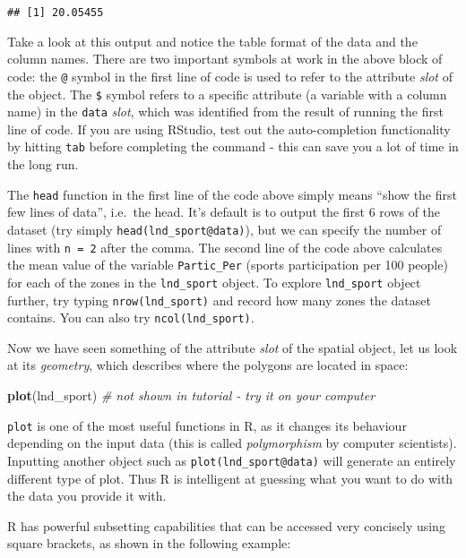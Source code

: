 \documentclass[]{article}
\newenvironment{Shaded}{}{}
\newcommand{\KeywordTok}[1]{\textcolor[rgb]{0.00,0.44,0.13}{\textbf{{#1}}}}
\newcommand{\CommentTok}[1]{\textcolor[rgb]{0.38,0.63,0.69}{\textit{{#1}}}}
\newcommand{\NormalTok}[1]{{#1}}
\begin{document}
\begin{verbatim}
## [1] 20.05455
\end{verbatim}

Take a look at this output and notice the table format of the data and
the column names. There are two important symbols at work in the above
block of code: the \texttt{@} symbol in the first line of code is used
to refer to the attribute \emph{slot} of the object. The \texttt{\$}
symbol refers to a specific attribute (a variable with a column name) in
the \texttt{data} \emph{slot}, which was identified from the result of
running the first line of code. If you are using RStudio, test out the
auto-completion functionality by hitting \texttt{tab} before completing
the command - this can save you a lot of time in the long run.

The \texttt{head} function in the first line of the code above simply
means ``show the first few lines of data'', i.e.~the head. It's default
is to output the first 6 rows of the dataset (try simply
\texttt{head(lnd\_sport@data)}), but we can specify the number of lines
with \texttt{n = 2} after the comma. The second line of the code above
calculates the mean value of the variable \texttt{Partic\_Per} (sports
participation per 100 people) for each of the zones in the
\texttt{lnd\_sport} object. To explore \texttt{lnd\_sport} object
further, try typing \texttt{nrow(lnd\_sport)} and record how many zones
the dataset contains. You can also try \texttt{ncol(lnd\_sport)}.

Now we have seen something of the attribute \emph{slot} of the spatial
object, let us look at its \emph{geometry}, which describes where the
polygons are located in space:

\begin{Shaded}
\begin{Highlighting}[]
\KeywordTok{plot}\NormalTok{(lnd_sport) }\CommentTok{# not shown in tutorial - try it on your computer}
\end{Highlighting}
\end{Shaded}

\texttt{plot} is one of the most useful functions in R, as it changes
its behaviour depending on the input data (this is called
\emph{polymorphism} by computer scientists). Inputting another object
such as \texttt{plot(lnd\_sport@data)} will generate an entirely
different type of plot. Thus R is intelligent at guessing what you want
to do with the data you provide it with.

R has powerful subsetting capabilities that can be accessed very
concisely using square brackets, as shown in the following example:
\end{document}

